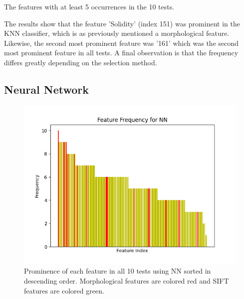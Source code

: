 \documentclass{kththesis}
\begin{document}
\begin{table}[h!]
  \caption{The features with at least 5 occurrences in the 10 tests.}
  \begin{center}
  \end{center}
  \label{knn_features}
\end{table}

\newpage

The results show that the feature 'Solidity' (index 151) was prominent in the KNN classifier, which is as previously mentioned a morphological feature. Likewise, the second most prominent feature was '161' which was the second most prominent feature in all tests. A final observation is that the frequency differs greatly depending on the selection method.


\newpage

\subsection{Neural Network}

\begin{figure}[h!]
  \centering
  \includegraphics[scale=0.8]{figures/nn_all_freqs.png}
  \caption{Prominence of each feature in all 10 tests using NN sorted in descending order. Morphological features are colored red and SIFT features are colored green.}
  \label{fig:freq_nn}
\end{figure}
\end{document}
